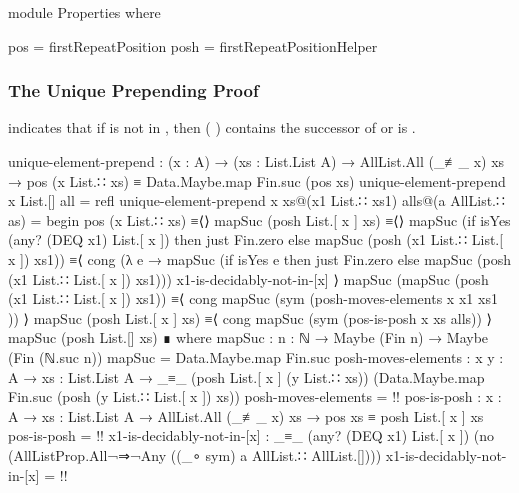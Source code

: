\documentclass{report}
\begin{document}
\begin{code}
  module Properties where

    pos = firstRepeatPosition
    posh = firstRepeatPositionHelper
\end{code}

\subsubsection{The Unique Prepending Proof}
 indicates that if  is not in , then  \AgdaSymbol(  \AgdaSymbol) contains the successor of   or is .

\begin{code}
    unique-element-prepend :
      (x : A) →
      (xs : List.List A) →
      AllList.All (_≢_ x) xs →
      pos (x List.∷ xs) ≡ Data.Maybe.map Fin.suc (pos xs)
    unique-element-prepend x List.[] all = refl
    unique-element-prepend x xs@(x1 List.∷ xs1) alls@(a AllList.∷ as) = begin
      pos (x List.∷ xs)
        ≡⟨⟩
      mapSuc (posh List.[ x ] xs)
        ≡⟨⟩
      mapSuc (if isYes (any? (DEQ x1) List.[ x ])
                 then just Fin.zero
                 else mapSuc (posh (x1 List.∷ List.[ x ]) xs1))
        ≡⟨ cong (λ e → mapSuc (if isYes e
                                   then just Fin.zero
                                   else mapSuc (posh (x1 List.∷ List.[ x ]) xs1)))
                x1-is-decidably-not-in-[x] ⟩
      mapSuc (mapSuc (posh (x1 List.∷ List.[ x ]) xs1))
        ≡⟨ cong mapSuc (sym (posh-moves-elements {x} {x1} {xs1} )) ⟩
      mapSuc (posh List.[ x ] xs)
        ≡⟨ cong mapSuc (sym (pos-is-posh {x} {xs} alls)) ⟩
      mapSuc (posh List.[] xs) ∎
      where
      mapSuc : {n : ℕ} → Maybe (Fin n) → Maybe (Fin (ℕ.suc n))
      mapSuc = Data.Maybe.map Fin.suc
      posh-moves-elements :
        {x y : A} →
        {xs : List.List A} →
        _≡_ (posh List.[ x ] (y List.∷ xs))
            (Data.Maybe.map Fin.suc (posh (y List.∷ List.[ x ]) xs))
      posh-moves-elements = {!!}
      pos-is-posh :
        {x : A} →
        {xs : List.List A} →
        AllList.All (_≢_ x) xs →
        pos xs ≡ posh List.[ x ] xs
      pos-is-posh = {!!}
      x1-is-decidably-not-in-[x] :
        _≡_ (any? (DEQ x1) List.[ x ])
            (no (AllListProp.All¬⇒¬Any ((_∘ sym) a AllList.∷ AllList.[])))
      x1-is-decidably-not-in-[x] = {!!}
\end{code}
\end{document}
